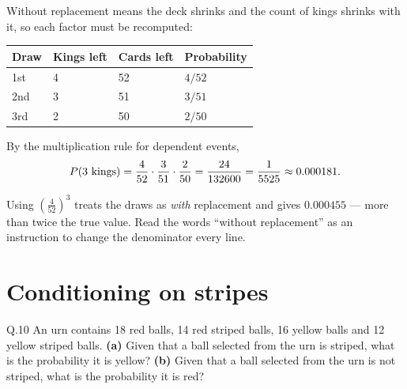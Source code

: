 \begin{solution}
Without replacement means the deck shrinks and the count of kings shrinks with
it, so each factor must be recomputed:

\begin{center}
\small\sffamily
\begin{tabular}{@{}l C{2.6cm} C{2.6cm} C{2.4cm}@{}}
\toprule
\textbf{Draw} & \textbf{Kings left} & \textbf{Cards left} & \textbf{Probability} \\
\midrule
1st & 4 & 52 & $4/52$ \\
2nd & 3 & 51 & $3/51$ \\
3rd & 2 & 50 & $2/50$ \\
\bottomrule
\end{tabular}
\end{center}

By the multiplication rule for dependent events,
\[
P\!\left(3\text{ kings}\right)=\frac{4}{52}\cdot\frac{3}{51}\cdot\frac{2}{50}
=\frac{24}{132600}=\frac{1}{5525}\approx 0.000181 .
\]


\end{solution}

\begin{pitfall}
Using $\left(\tfrac{4}{52}\right)^{3}$ treats the draws as \emph{with}
replacement and gives $0.000455$ --- more than twice the true value. Read the
words ``without replacement'' as an instruction to change the denominator every
line.
\end{pitfall}

\section{Conditioning on stripes}

\begin{question}{Q.10}
An urn contains 18 red balls, 14 red striped balls, 16 yellow balls and 12
yellow striped balls.
\textbf{(a)} Given that a ball selected from the urn is striped, what is the
probability it is yellow?
\textbf{(b)} Given that a ball selected from the urn is not striped, what is the
probability it is red?
\end{question}

